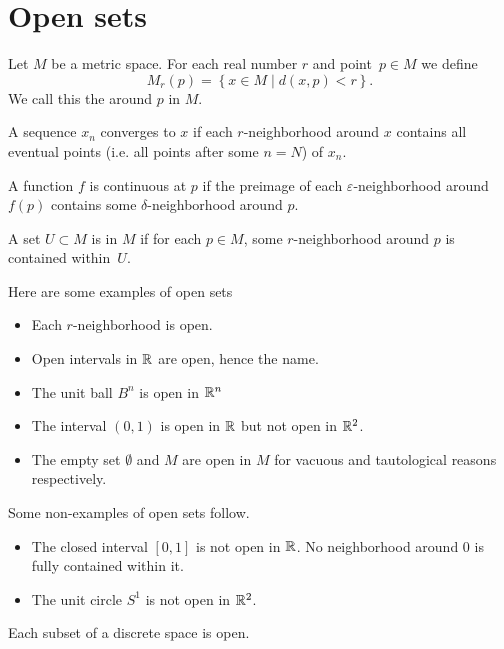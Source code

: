 \documentclass[11pt]{scrreport}
\begin{document}
\section{Open sets}
\begin{definition}
    Let $M$ be a metric space. For each real number $r$ and point $p\in M$ we define
    \[M_r(p)=\left\{x\in M \mid d(x,p)<r\right\}.\]
    We call this the  around $p$ in $M$.
\end{definition}
A sequence $x_n$ converges to $x$ if each $r$-neighborhood around $x$ contains all eventual points (i.e. all points after some $n=N$) of $x_n$.
\begin{remark}
    A function $f$ is continuous at $p$ if the preimage of each $\varepsilon$-neighborhood around $f(p)$ contains some $\delta$-neighborhood around $p$.
\end{remark}
\begin{definition}
    A set $U\subset M$ is  in $M$ if for each $p\in M$, some $r$-neighborhood around $p$ is contained within $U$.
\end{definition}
\begin{example}
    Here are some examples of open sets
    \begin{itemize}
        \item Each $r$-neighborhood is open. 
        \item Open intervals in $\mathbb R$ are open, hence the name.
        \item The unit ball $B^n$ is open in $\mathbb R^n$
        \item The interval $(0,1)$ is open in $\mathbb R$ but not open in $\mathbb R^2$.
        \item The empty set $\emptyset$ and $M$ are open in $M$ for vacuous and tautological reasons respectively.
    \end{itemize}
\end{example}
\begin{example}
    Some non-examples of open sets follow.
    \begin{itemize}
        \item The closed interval $[0,1]$ is not open in $\mathbb R$. No neighborhood around $0$ is fully contained within it.
        \item The unit circle $S^1$ is not open in $\mathbb R^2$.
    \end{itemize}
\end{example}
\begin{remark}
    Each subset of a discrete space is open.
\end{remark}
\end{document}
